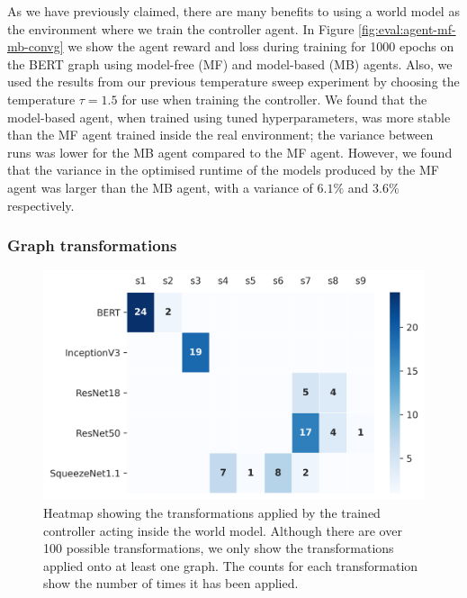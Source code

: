 As we have previously claimed, there are many benefits to using a world model as the environment where we train the controller agent. In Figure \ref{fig:eval:agent-mf-mb-convg} we show the agent reward and loss during training for 1000 epochs on the BERT graph using model-free (MF) and model-based (MB) agents. Also, we used the results from our previous temperature sweep experiment by choosing the temperature $\tau = 1.5$ for use when training the controller. We found that the model-based agent, when trained using tuned hyperparameters, was more stable than the MF agent trained inside the real environment; the variance between runs was lower for the MB agent compared to the MF agent. However, we found that the variance in the optimised runtime of the models produced by the MF agent was larger than the MB agent, with a variance of $6.1\%$ and $3.6\%$ respectively.


\subsubsection{Graph transformations}

\begin{figure}[ht]
  \centering
  \includegraphics[width=1\columnwidth]{sections/5evaluation/images/xfer_heatmap}
  \caption[Heatmap of graph transformations applied by MB controller]{Heatmap showing the transformations applied by the trained controller acting inside the world model. Although there are over 100 possible transformations, we only show the transformations applied onto at least one graph. The counts for each transformation show the number of times it has been applied.}
  \label{fig:eval:xfer-heatmap}
\end{figure}

